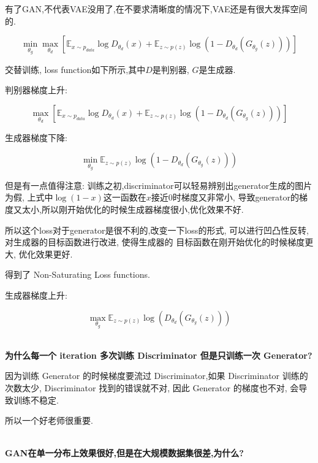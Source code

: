	有了GAN,不代表VAE没用了,在不要求清晰度的情况下,VAE还是有很大发挥空间的.
	
	\begin{equation}
		\min _{\theta_{g}} \max _{\theta_{d}}\left[\mathbb{E}_{x \sim p_{d a t a}} \log D_{\theta_{d}}(x)+\mathbb{E}_{z \sim p(z)} \log \left(1-D_{\theta_{d}}\left(G_{\theta_{g}}(z)\right)\right)\right]
	\end{equation}

	交替训练, loss function如下所示,其中$D$是判别器, $G$是生成器.

	判别器梯度上升:
	
	\begin{equation}
	\max_{\theta_d}\left[\mathbb{E}_{x\sim p_{data}}\log D_{\theta_d}(x)+\mathbb{E}_{z\sim p(z)}\log(1-D_{\theta_d}(G_{\theta_g}(z)))\right]
	\end{equation}

	生成器梯度下降:

	\begin{equation}
	\min_{\theta_g}\mathbb{E}_{z\sim p(z)}\log(1-D_{\theta_d}(G_{\theta_g}(z)))	
	\end{equation}
	
	但是有一点值得注意:
	训练之初,discriminator可以轻易辨别出generator生成的图片为假,
	上式中$\log(1-x)$这一函数在$x$接近$0$时梯度又非常小,
	导致generator的梯度又太小,所以刚开始优化的时候生成器梯度很小,优化效果不好.
	
	所以这个loss对于generator是很不利的,改变一下loss的形式,
	可以进行凹凸性反转, 对生成器的目标函数进行改进, 使得生成器的
	目标函数在刚开始优化的时候梯度更大, 优化效果更好.

	得到了 Non-Saturating Loss functions.

	生成器梯度上升:

	\begin{equation}
	\max_{\theta_g}\mathbb{E}_{z\sim p(z)}\log(D_{\theta_d}(G_{\theta_g}(z)))
	\end{equation}

	\textbf{\\为什么每一个 iteration 多次训练 Discriminator 但是只训练一次 Generator?}

	因为训练 Generator 的时候梯度要流过 Discriminator,如果 Discriminator 训练的次数太少,
	Discriminator 找到的错误就不对, 因此 Generator 的梯度也不对, 会导致训练不稳定.

	所以一个好老师很重要.

	\textbf{\\GAN在单一分布上效果很好,但是在大规模数据集很差,为什么?}

